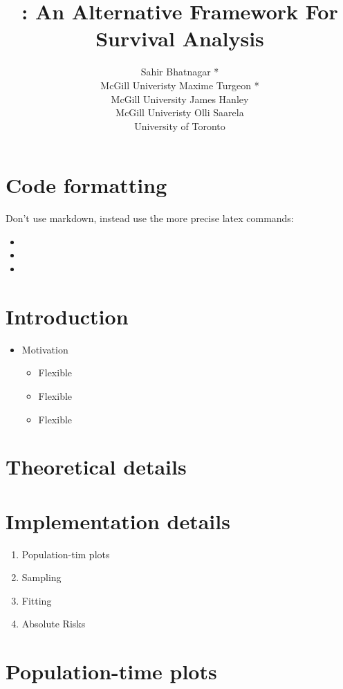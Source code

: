 \documentclass[article]{jss}
\author{
Sahir Bhatnagar *\\McGill Univeristy \And Maxime Turgeon *\\McGill University \And James Hanley\\McGill Univeristy \And Olli Saarela\\University of Toronto
}
\title{\pkg{casebase}: An Alternative Framework For Survival Analysis}
\providecommand{\tightlist}{%
  \setlength{\itemsep}{0pt}\setlength{\parskip}{0pt}}
\begin{document}
\section{Code formatting}\label{code-formatting}

Don't use markdown, instead use the more precise latex commands:

\begin{itemize}
\tightlist
\item
\item
\item
\end{itemize}

\section{Introduction}\label{introduction}

\begin{itemize}
\tightlist
\item
  Motivation

  \begin{itemize}
  \tightlist
  \item
    Flexible
  \item
    Flexible
  \item
    Flexible
  \end{itemize}
\end{itemize}

\section{Theoretical details}\label{theoretical-details}

\section{Implementation details}\label{implementation-details}

\begin{enumerate}
\def\labelenumi{\arabic{enumi}.}
\tightlist
\item
  Population-tim plots
\item
  Sampling
\item
  Fitting
\item
  Absolute Risks
\end{enumerate}

\section{Population-time plots}\label{population-time-plots}
\end{document}
